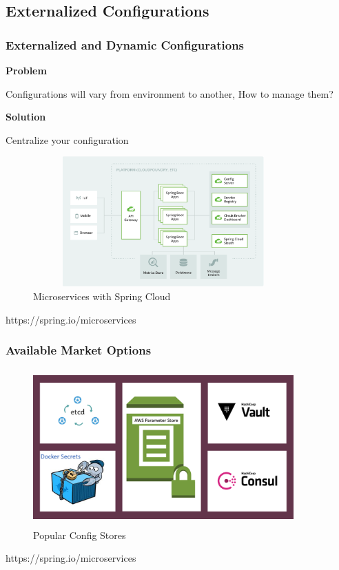 \documentclass{beamer}
\begin{document}
	\subsection {Externalized Configurations}
		\begin{frame}
			\frametitle{Externalized and \color{blue} {Dynamic Configurations}}
			\scriptsize
				\textbf {Problem} \par
					\hspace{3mm} Configurations will vary from environment to another, How to manage them?
				
				\vspace{2mm}
				\textbf {Solution} \par	
					\hspace{3mm} Centralize your configuration
				
				\begin{figure}[h]
					\includegraphics[width=100mm,height=50mm, scale=1]{img/microservice-diagrame.png}
					\caption{Microservices with Spring Cloud}
				\end{figure}\vspace{20mm}
				
				\tiny{https://spring.io/microservices}	
		\end{frame}
	
	\begin{frame}
		\frametitle{Available Market Options}
			
			\begin{figure}[h]
				\includegraphics[width=100mm,height=60mm,  scale=1]{img/Configs.png}
				\caption{Popular Config Stores}
			\end{figure}\vspace{20mm}
			
			\tiny{https://spring.io/microservices}	
	\end{frame}
\end{document}
